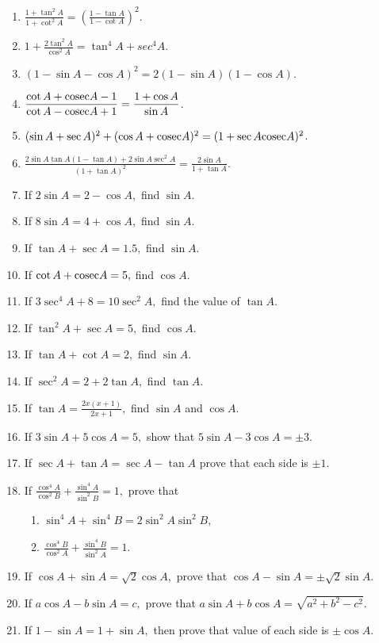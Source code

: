 \begin{enumerate}
\item $\frac{1 + \tan^2 A}{1 + \cot^2 A} = \left(\frac{1 - \tan A}{1 - \cot A}\right)^2$.
\item $1 + \frac{2\tan^2 A}{\cos^2 A} = \tan^4 A + sec^4 A$.
\item $(1 - \sin A - \cos A)^2 = 2(1 - \sin A)(1 - \cos A)$.
\item $\frac{\cot A + {\rm cosec} A - 1}{\cot A - {\rm cosec} A + 1} = \frac{1 + \cos A}{\sin A}$.
\item $(\sin A + \sec A)^2 + (\cos A + {\rm cosec} A)^2 = (1 + \sec A{\rm cosec} A)^2$.
\item $\frac{2\sin A\tan A(1 - \tan A) + 2\sin A\sec^2A}{(1 + \tan A)^2} = \frac{2\sin A}{1 + \tan A}$.
\item If $2\sin A = 2 - \cos A,$ find $\sin A$.
\item If $8\sin A = 4 + \cos A,$ find $\sin A$.
\item If $\tan A + \sec A = 1.5,$ find $\sin A$.
\item If $\cot A + {\rm cosec} A = 5,$ find $\cos A$.
\item If $3\sec^4 A + 8 = 10\sec^2A,$ find the value of $\tan A$.
\item If $\tan^2A + \sec A = 5,$ find $\cos A$.
\item If $\tan A + \cot A = 2,$ find $\sin A$.
\item If $\sec^2A = 2 + 2\tan A,$ find $\tan A$.
\item If $\tan A = \frac{2x(x + 1)}{2x + 1},$ find $\sin A$ and $\cos A$.
\item If $3\sin A + 5\cos A = 5,$ show that $5\sin A - 3\cos A = \pm 3$.
\item If $\sec A + \tan A = \sec A - \tan A$ prove that each side is $\pm 1$.
\item If $\frac{\cos^4 A}{\cos^2 B} + \frac{\sin^4 A}{\sin^2 B} = 1,$ prove that
  \begin{enumerate}
    \item $\sin^4A + \sin^4B = 2\sin^2A \sin^2B$,
    \item $\frac{\cos^4 B}{\cos^2 A} + \frac{\sin^4 B}{\sin^2 A} = 1$.
  \end{enumerate}
\item If $\cos A + \sin A = \sqrt{2}\cos A,$ prove that $\cos A - \sin A = \pm \sqrt{2}\sin A$.
\item If $a\cos A - b\sin A = c,$ prove that $a\sin A + b\cos A = \sqrt{a^2 + b ^2 - c^2}$.
\item If $1 - \sin A = 1 + \sin A,$ then prove that value of each side is $\pm \cos A$.

\end{enumerate}
